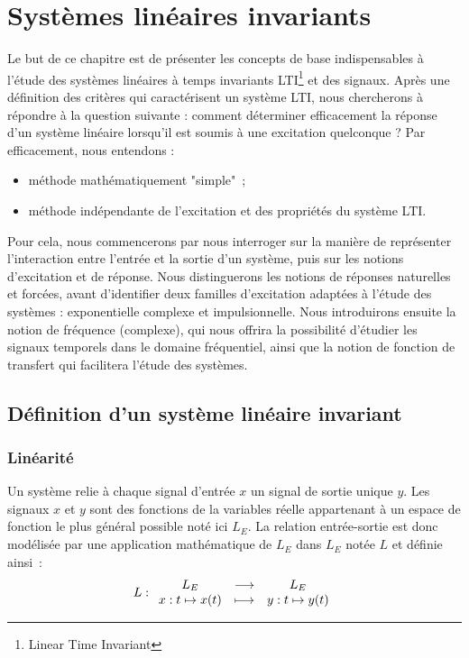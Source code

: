 \chapter{Systèmes linéaires invariants}
\label{chap:lti}
Le but de ce chapitre est de présenter les concepts de base
indispensables à l'étude des systèmes linéaires à temps invariants
LTI\footnote{ Linear Time Invariant} et des signaux.  Après une
définition des critères qui caractérisent un système LTI, nous
chercherons à répondre à la question suivante : comment déterminer
efficacement la réponse d'un système linéaire lorsqu'il est soumis à
une excitation quelconque ?  Par efficacement, nous entendons :
\begin{itemize}
\item méthode mathématiquement "simple"~;
\item méthode indépendante de l'excitation et des propriétés du
  système LTI.
\end{itemize}


Pour cela, nous commencerons par nous interroger sur la manière de
représenter l'interaction entre l'entrée et la sortie d'un système,
puis sur les notions d'excitation et de réponse. Nous distinguerons
les notions de réponses naturelles et forcées, avant d'identifier deux
familles d'excitation adaptées à l'étude des systèmes : exponentielle
complexe et impulsionnelle. Nous introduirons ensuite la notion de
fréquence (complexe), qui nous offrira la possibilité d'étudier les
signaux temporels dans le domaine fréquentiel, ainsi que la notion de
fonction de transfert qui facilitera l'étude des systèmes.
	
	
\section{Définition d'un système linéaire invariant}

	\subsection{Linéarité} 
	Un système relie à chaque signal d'entrée $x$ un signal de
        sortie unique $y$. Les signaux $x$ et $y$ sont des fonctions
        de la variables réelle appartenant à un espace de fonction le
        plus général possible noté ici $L_E$. La relation
        entrée-sortie est donc modélisée par une application
        mathématique de $L_E$ dans $L_E$ notée $L$ et définie ainsi~:
	\begin{equation}
          L : \begin{array}{ccc} L_E & \longrightarrow & L_E \\ x : t\mapsto x(t) & \longmapsto & y : t\mapsto y(t) \\ \end{array} 
	\end{equation}

